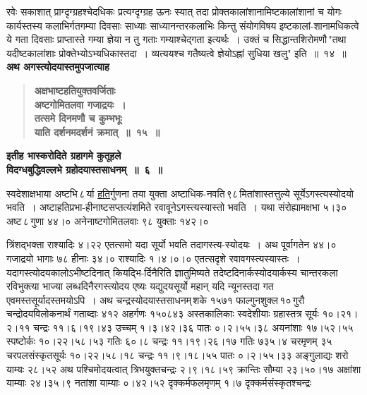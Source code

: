 \documentclass[11pt, openany]{book}
\begin{document}
\begin{sloppypar}
रवेः सकाशात् प्राग्दृग्ग्रहश्चेदधिकः प्रत्यग्दृग्ग्रह ऊनः स्यात् तदा प्रोक्तकालांशानामिष्टकालांशानां च योगः कार्यस्तस्य कलाभिर्गतगम्या दिवसाः साध्याः साध्यानन्तरकलाभिः किन्तु संयोगविषय इष्टकालां-शानामधिकत्वे ये गता दिवसाः प्राप्तास्ते गम्या ज्ञेया न तु गताः गम्याश्चेद्गता इत्यर्थः~। उक्तं च {\color{violet}सिद्धान्तशिरोमणौ\textendash \,"तथा यदीष्टकालांशाः प्रोक्तेभ्योऽभ्यधिकास्तदा~। व्यत्ययश्च गतैष्यत्वे ज्ञेयोऽह्नां सुधिया खलु"} इति~॥~१४~॥\\

{\small \textbf{अथ अगस्त्योदयास्तमुपजात्याह\textendash }}

 \label{6.15}
\begin{quote}
{\large \textbf{{\color{purple}अक्षभाष्टहतियुक्तवर्जिताः \\ 
अष्टगोमितलवा गजाद्रयः~। \\
तत्समे दिनमणौ च कुम्भभूः \\
याति दर्शनमदर्शनं क्रमात्~॥~१५~॥}}}
\end{quote}

\begin{center}
{\large \textbf{इतीह भास्करोदिते ग्रहागमे कुतूहले \\
विदग्धबुद्धिवल्लभे ग्रहोदयास्तसाधनम्~॥~६~॥}}
\end{center}

स्वदेशाक्षभाया अष्टभि\textendash \,८\textendash \,र्या \hyperref[6.15]{हति}र्गुणना तया युक्ता अष्टाधिक-नवति\textendash \,९८\textendash \,मितांशास्तत्तुल्ये सूर्येऽगस्त्यस्योदयो भवति~। अष्टाहतिप्रभा-हीनाष्टसप्तत्यंशमिते रवावूनेऽगस्त्यस्यास्तो भवति~। यथा संरोह्यामक्षभा ५।३० अष्ट\textendash \,८\textendash \,गुणा ४४।० अनेनाष्टगोमितलवाः ९८ युक्ताः १४२।०
\end{sloppypar}

\newpage

\begin{sloppypar}
\noindent त्रिंशद्भक्ता राश्यादिः ४।२२ एतत्समो यदा सूर्यो भवति तदागस्त्य-स्योदयः~। अथ पूर्वागतेन ४४।० गजाद्रयो भागाः ७८ हीनाः ३४।० राश्यादिः १।४।०।० एतत्सदृशे रवावगस्त्यस्यास्तः~। यदागस्त्योदयकालोऽभीष्टदिनात् कियद्भि-र्दिनैरिति ज्ञातुमिष्यते तदेष्टदिनार्कस्योदयार्कस्य चान्तरकला रविभुक्त्या भाज्या लब्धदिनैरगस्त्योदय एष्यः यद्युदयसूर्यो महान् यदि न्यूनस्तदा गत एवमस्तसूर्यादस्तमयोऽपि~। अथ चन्द्रस्योदयास्तसाधनम्\textendash \,शके १५७१ फाल्गुनशुक्ल\textendash \,१०\textendash \,गुरौ चन्द्रोदयविलोकनार्थं गताब्दाः ४१२ अहर्गणः १५०८४३ अस्तकालिकाः स्वदेशीयाः ग्रहास्तत्र सूर्यः १०।२१।२।११ चन्द्रः ११।६।१९।४३ उच्चम् १।३।४२।३६ पातः ०।२।५५।३८ अयनांशाः १७।५२।५५ स्पष्टोर्कः १०।२२।५८।५३ गतिः ६०।८ चन्द्रः ११।१९।२६।१७ गतिः ७३५।४ चरमृणम् ३५ चरपलसंस्कृतसूर्यः १०।२२।५८।१८ चन्द्रः ११।९।१८।५५ पातः ०।२।५५।३३ अङ्गुलाद्यः शरो याम्यः २८।५२ अथ पश्चिमोदयत्वात् त्रिभयुक्तचन्द्रः २।९।१८।५९ क्रान्तिः सौम्या २३।५०।१७ अक्षांशा याम्याः २४।३५।९ नतांशा याम्याः ०।४२।५२ दृक्कर्मफलमृणम् १।७ दृक्कर्मसंस्कृतश्चन्द्रः
\end{sloppypar}
\end{document}

